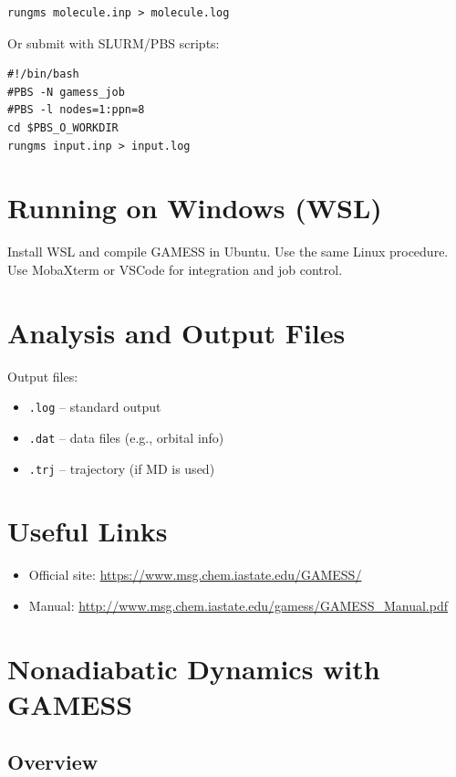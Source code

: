 \begin{verbatim}
rungms molecule.inp > molecule.log
\end{verbatim}

Or submit with SLURM/PBS scripts:

\begin{verbatim}
#!/bin/bash
#PBS -N gamess_job
#PBS -l nodes=1:ppn=8
cd $PBS_O_WORKDIR
rungms input.inp > input.log
\end{verbatim}

\section{Running on Windows (WSL)}

Install WSL and compile GAMESS in Ubuntu. Use the same Linux procedure. Use MobaXterm or VSCode for integration and job control.

\section{Analysis and Output Files}

Output files:

\begin{itemize}
  \item \texttt{.log} – standard output
  \item \texttt{.dat} – data files (e.g., orbital info)
  \item \texttt{.trj} – trajectory (if MD is used)
\end{itemize}

\section{Useful Links}

\begin{itemize}
  \item Official site: \url{https://www.msg.chem.iastate.edu/GAMESS/}
  \item Manual: \url{http://www.msg.chem.iastate.edu/gamess/GAMESS_Manual.pdf}
\end{itemize}


\section{Nonadiabatic Dynamics with GAMESS}

\subsection*{Overview}

